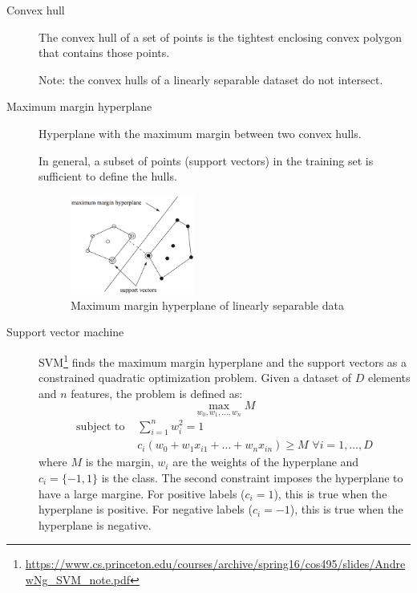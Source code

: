 \begin{description}
    \item[Convex hull]
        The convex hull of a set of points is the tightest enclosing convex polygon that contains those points.

        Note: the convex hulls of a linearly separable dataset do not intersect.

    \item[Maximum margin hyperplane] 
        Hyperplane with the maximum margin between two convex hulls.

        In general, a subset of points (support vectors)  
        in the training set is sufficient to define the hulls.

        \begin{figure}[h]
            \centering
            \includegraphics[width=0.4\textwidth]{img/svm.png}
            \caption{Maximum margin hyperplane of linearly separable data}
        \end{figure}

    \item[Support vector machine] 
        SVM\footnote{\scriptsize\url{https://www.cs.princeton.edu/courses/archive/spring16/cos495/slides/AndrewNg_SVM_note.pdf}} 
        finds the maximum margin hyperplane and the support vectors as a constrained quadratic optimization problem.
        Given a dataset of $D$ elements and $n$ features, the problem is defined as:
        \[ \max_{w_0, w_1, \dots, w_n} M \]
        \[ 
            \begin{split}
                \text{subject to }  & \sum_{i=1}^{n} w_i^2 = 1 \\
                                    & c_i(w_0 + w_1 x_{i1} + \dots + w_n x_{in}) \geq M \,\, \forall i = 1, \dots, D
            \end{split}    
        \]
        where $M$ is the margin, $w_i$ are the weights of the hyperplane and $c_i = \{-1, 1 \}$ is the class.
        The second constraint imposes the hyperplane to have a large margine. 
        For positive labels ($c_i=1$), this is true when the hyperplane is positive.
        For negative labels ($c_i=-1$), this is true when the hyperplane is negative.


\end{description}
